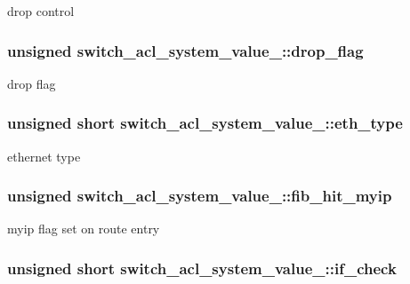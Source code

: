 drop control \hypertarget{unionswitch__acl__system__value___a1552157439ec21c527248f7bad8976bb}{
\subsubsection[{drop\+\_\+flag}]{\setlength{\rightskip}{0pt plus 5cm}unsigned switch\+\_\+acl\+\_\+system\+\_\+value\+\_\+\+::drop\+\_\+flag}}\label{unionswitch__acl__system__value___a1552157439ec21c527248f7bad8976bb}
drop flag \hypertarget{unionswitch__acl__system__value___a1d23d60d9359ed737cdd9f51ffa37acd}{
\subsubsection[{eth\+\_\+type}]{\setlength{\rightskip}{0pt plus 5cm}unsigned short switch\+\_\+acl\+\_\+system\+\_\+value\+\_\+\+::eth\+\_\+type}}\label{unionswitch__acl__system__value___a1d23d60d9359ed737cdd9f51ffa37acd}
ethernet type \hypertarget{unionswitch__acl__system__value___abc84b81051d04b5b3fbf879ed1d760a0}{
\subsubsection[{fib\+\_\+hit\+\_\+myip}]{\setlength{\rightskip}{0pt plus 5cm}unsigned switch\+\_\+acl\+\_\+system\+\_\+value\+\_\+\+::fib\+\_\+hit\+\_\+myip}}\label{unionswitch__acl__system__value___abc84b81051d04b5b3fbf879ed1d760a0}
myip flag set on route entry \hypertarget{unionswitch__acl__system__value___aec4cf30c26cb6e5bf1b416316a2528b6}{
\subsubsection[{if\+\_\+check}]{\setlength{\rightskip}{0pt plus 5cm}unsigned short switch\+\_\+acl\+\_\+system\+\_\+value\+\_\+\+::if\+\_\+check}}\label{unionswitch__acl__system__value___aec4cf30c26cb6e5bf1b416316a2528b6}
